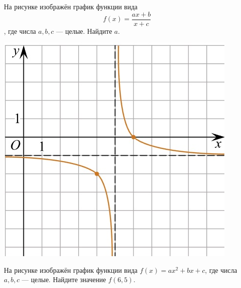 \begin{class}[number=5]
\begin{listofex}
\begin{minipage}[t]{0.22\textwidth}
		\end{minipage}
		\item
		\begin{minipage}[t]{0.66\textwidth}
			На рисунке изображён график функции вида \[ f(x)=\dfrac{ax+b}{x+c} \], где числа \(a, b, c\) --- целые. Найдите \(a\).
		\end{minipage}
		\hspace{0.05\textwidth}
		\begin{minipage}[t]{0.22\textwidth}
			\includegraphics[align=t, width=\textwidth]{pics/G101M4C5-5.jpg}
		\end{minipage}
		\item
		\begin{minipage}[t]{0.66\textwidth}
			На рисунке изображён график функции вида \(f(x)=ax^2+bx+c\), где числа \(a, b, c\) --- целые. Найдите значение \(f(6,5)\).
		\end{minipage}
		\hspace{0.05\textwidth}
		\begin{minipage}[t]{0.22\textwidth}

\end{minipage}
\end{listofex}
\end{class}
